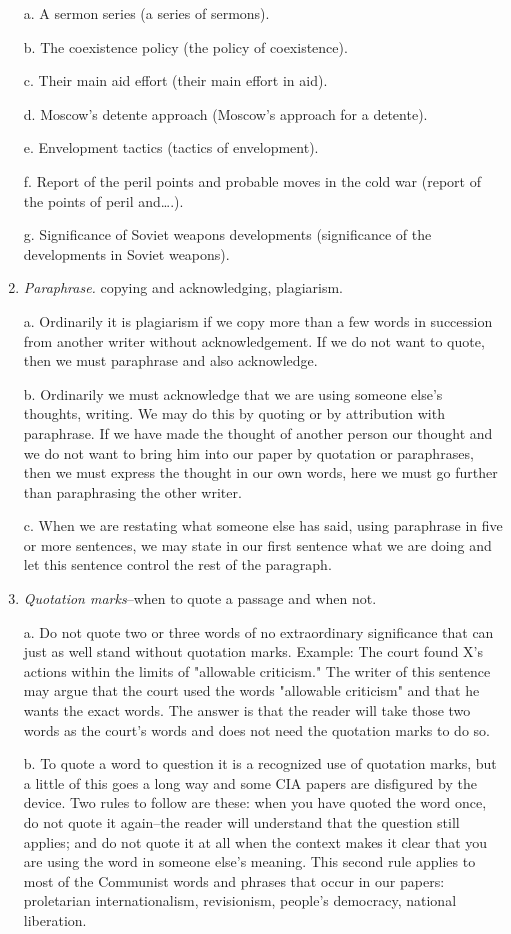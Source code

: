 \documentclass[
    oneside,
    11pt,
    draft
]{memoir}
\begin{document}
\begin{enumerate}
  a. A sermon series (a series of sermons). 
  
  b. The coexistence policy (the policy of coexistence).
  
  c. Their main aid effort (their main effort in aid).
  
  d. Moscow's detente approach (Moscow's approach for a detente).
  
  e. Envelopment tactics (tactics of envelopment).
  
  f. Report of the peril points and probable moves in the cold war (report of the points of peril and\dots.).
  
  g. Significance of Soviet weapons developments (significance of the developments in Soviet weapons).

  \item \emph{Paraphrase.} copying and acknowledging, plagiarism.
  
  a. Ordinarily it is plagiarism if we copy more than a few words in succession from another writer without acknowledgement. If we do not want to quote, then we must paraphrase and also acknowledge. 
  
  b. Ordinarily we must acknowledge that we are using someone else's thoughts, writing. We may do this by quoting or by attribution with paraphrase. If we have made the thought of another person our thought and we do not want to bring him into our paper by quotation or paraphrases, then we must express the thought in our own words, here we must go further than paraphrasing the other writer. 
  
  c. When we are restating what someone else has said, using paraphrase in five or more sentences, we may state in our first sentence what we are doing and let this sentence control the rest of the paragraph. 

  \item \emph{Quotation marks}--when to quote a passage and when not.
  
  a. Do not quote two or three words of no extraordinary significance that can just as well stand without quotation marks. Example: The court found X's actions within the limits of "allowable criticism." The writer of this sentence may argue that the court used the words "allowable criticism" and that he wants the exact words. The answer is that the reader will take those two words as the court's words and does not need the quotation marks to do so.
  
  b. To quote a word to question it is a recognized use of quotation marks, but a little of this goes a long way and some CIA papers are disfigured by the device. Two rules to follow are these: when you have quoted the word once, do not quote it again--the reader will understand that the question still applies; and do not quote it at all when the context makes it clear that you are using the word in someone else's meaning. This second rule applies to most of the Communist words and phrases that occur in our papers: proletarian internationalism, revisionism, people's democracy, national liberation.
  

\end{enumerate}
\end{document}
